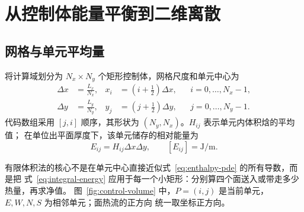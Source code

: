 \documentclass[UTF8,11pt]{ctexart}
\numberwithin{equation}{section}
\begin{document}
\section{从控制体能量平衡到二维离散}

\subsection{网格与单元平均量}

将计算域划分为 $N_x\times N_y$ 个矩形控制体，网格尺度和单元中心为
\begin{align}
      \Delta x&=\frac{L_x}{N_x},
      &x_i&=\left(i+\frac12\right)\Delta x,
      &&i=0,\ldots,N_x-1,\\
      \Delta y&=\frac{L_y}{N_y},
      &y_j&=\left(j+\frac12\right)\Delta y,
      &&j=0,\ldots,N_y-1.
      \label{eq:grid}
\end{align}
代码数组采用 $[j,i]$ 顺序，其形状为 $(N_y,N_x)$。$H_{ij}$ 表示单元内体积焓的平均值；
在单位出平面厚度下，该单元储存的相对能量为
\begin{equation}
      E_{ij}=H_{ij}\Delta x\Delta y,
      \qquad [E_{ij}]=\si{\joule\per\metre}.
      \label{eq:cell-energy}
\end{equation}

有限体积法的核心不是在单元中心直接近似式~\eqref{eq:enthalpy-pde} 的所有导数，而是把
式~\eqref{eq:integral-energy} 应用于每一个小矩形：分别算四个面送入或带走多少热量，再求净值。
图~\ref{fig:control-volume} 中，$P=(i,j)$ 是当前单元，$E,W,N,S$ 为相邻单元；面热流的正方向
统一取坐标正方向。
\end{document}
